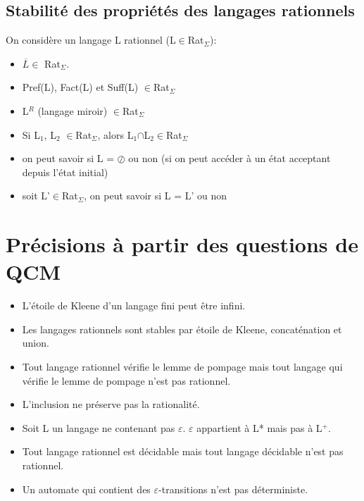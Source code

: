 \documentclass{article}
\begin{document}
\subsection{Stabilité des propriétés des langages rationnels}
On considère un langage L rationnel (L$\in$Rat$_{\Sigma}$):
\begin{itemize}
    \item $\overline{L} \in$ Rat$_{\Sigma}$.
    \item Pref(L), Fact(L) et Suff(L) $\in$Rat$_{\Sigma}$
    \item L$^{R}$ (langage miroir) $\in$Rat$_{\Sigma}$
    \item Si L$_{1}$, L$_{2}$ $\in$Rat$_{\Sigma}$, alors L$_{1}$$\cap$L$_{2}$$\in$Rat$_{\Sigma}$
    \item on peut savoir si L = $\oslash$ ou non (si on peut accéder à un état acceptant depuis l'état initial)
    \item soit L'$\in$Rat$_{\Sigma}$, on peut savoir si L = L' ou non
\end{itemize}
\newpage













\section{Précisions à partir des questions de QCM}
\begin{itemize}
	\item L'étoile de Kleene d'un langage fini peut être infini.
	\item Les langages rationnels sont stables par étoile de Kleene, concaténation et union.
	\item Tout langage rationnel vérifie le lemme de pompage mais tout langage qui vérifie le lemme de pompage n'est pas rationnel.
	\item L'inclusion ne préserve pas la rationalité.
    	\item Soit L un langage ne contenant pas $\varepsilon$. $\varepsilon$ appartient à L* mais pas à L$^{+}$.
    	\item Tout langage rationnel est décidable mais tout langage décidable n'est pas rationnel.
    	\item Un automate qui contient des $\varepsilon$-transitions n'est pas déterministe.
\end{itemize}
\end{document}
